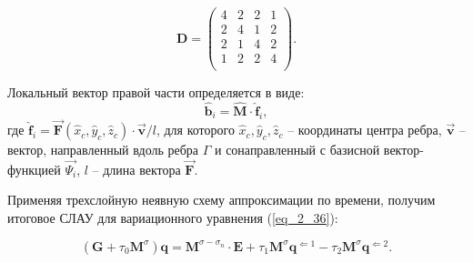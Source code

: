 \begin{equation*}
	\textbf{D} = \left(
	\begin{array}{rrrr}
		4 & 2 & 2 & 1 \\
		2 & 4 & 1 & 2 \\
		2 & 1 & 4 & 2 \\
		1 & 2 & 2 & 4 \\
	\end{array}
	\right).
\end{equation*}

Локальный вектор правой части определяется в виде:
\begin{equation} \label{eq_2_42}
	\hat{\textbf{b}}_i = \hat{\textbf{M}} \cdot \hat{\textbf{f}}_i,
\end{equation}
где $\hat{\textbf{f}}_i = \overrightarrow{\textbf{F}}(\hat{x}_c, \hat{y}_c, \hat{z}_c) \cdot \overrightarrow{\textbf{v}} / l$, для которого $\hat{x}_c, \hat{y}_c, \hat{z}_c$ -- координаты центра ребра, $\overrightarrow{\textbf{v}}$ -- вектор, направленный вдоль ребра $\Gamma$ и сонаправленный с базисной вектор-функцией $\overrightarrow{\textbf{$\Psi_i$}}$, $l$ -- длина вектора $\overrightarrow{\textbf{F}}$.

Применяя трехслойную неявную схему аппроксимации по времени, получим итоговое СЛАУ для вариационного уравнения (\ref{eq_2_36}):

\begin{equation} \label{eq_2_43}
	\left(\textbf{G} + \tau_0 \textbf{M}^{\sigma}\right) \textbf{q} = \textbf{M}^{\sigma - \sigma_n} \cdot \textbf{E} + \tau_1 \textbf{M}^{\sigma}  \textbf{q}^{\Leftarrow 1} - \tau_2 \textbf{M}^{\sigma}  \textbf{q}^{\Leftarrow 2}.
\end{equation}

